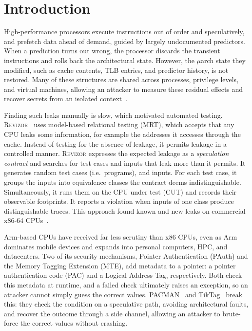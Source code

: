 \documentclass[letterpaper,twocolumn,10pt]{article}
\makeatletter
\theoremstyle{definition}
\def\uarch@bold#1#2\@nil{\if b#1\boldmath\fi}
\DeclareRobustCommand{\uarch}{{\expandafter\uarch@bold\f@series\@nil\ensuremath{\mu}}arch\xspace}
\makeatother
\begin{document}
\section{Introduction}
\label{sec:intro}
High-performance processors execute instructions out of order and
speculatively, and prefetch data ahead of demand, guided by largely
undocumented predictors. When a prediction turns out wrong, the processor
discards the transient instructions and rolls back the
architectural state. However, the \uarch state they modified,
such as cache contents, TLB entries, and predictor history, is not restored.
Many of these structures are shared across processes, privilege levels, and virtual machines,
allowing an attacker to measure these residual effects and recover secrets from an
isolated context~\cite{spectre,meltdown}.

Finding such leaks manually is slow, which motivated automated testing.
\textsc{Revizor}~\cite{revizor} uses model-based relational testing (MRT), which accepts that any
CPU leaks some information, for example the addresses it accesses through the cache. Instead of
testing for the absence of leakage, it permits leakage in a controlled manner. \textsc{Revizor} expresses
the expected leakage as a \emph{speculation contract} and searches for test cases and inputs
that leak more than it permits. It generates random test cases (i.e.\ programs), and inputs. For each test case, it
groups the inputs into equivalence classes the contract deems indistinguishable. Simultaneously, it
runs them on the CPU under test (CUT) and records their observable footprints. It reports a violation when inputs of one
class produce distinguishable traces. This approach found known and new leaks on commercial x86-64
CPUs~\cite{revizor,revizor_micro,hide_seek,speculation_fault}.

Arm-based CPUs have received far less scrutiny than x86 CPUs, even as Arm
dominates mobile devices and expands into personal computers, HPC, and datacenters. Two of
its security mechanisms, Pointer Authentication (PAuth) and the Memory Tagging Extension
(MTE), add metadata to a pointer: a pointer authentication code (PAC) and a Logical Address
Tag, respectively. Both check this metadata at runtime, and a failed check
ultimately raises an exception, so an attacker cannot simply guess the correct values.
PACMAN~\cite{pacman} and TikTag~\cite{tiktag} break this: they check the condition on a
speculative path, avoiding architectural faults, and recover the outcome through a side channel, allowing an attacker to brute-force the correct values without crashing.
\end{document}
